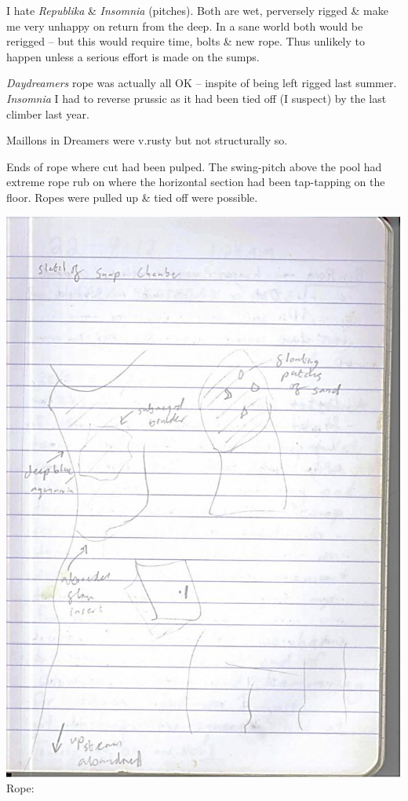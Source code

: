 I hate \emph{Republika} \& \emph{Insomnia} (pitches). Both are wet,
perversely rigged \& make me very unhappy on return from the deep. In a
sane world both would be rerigged -- but this would require time, bolts
\& new rope. Thus unlikely to happen unless a serious effort is made on
the sumps.

\emph{Daydreamers} rope was actually all OK -- inspite of being left
rigged last summer. \emph{Insomnia} I had to reverse prussic as it had
been tied off (I suspect) by the last climber last year.

Maillons in Dreamers were v.rusty but not structurally so.

Ends of rope where cut had been pulped. The swing-pitch above the pool
had extreme rope rub on where the horizontal section had been
tap-tapping on the floor. Ropes were pulled up \& tied off were
possible.

\includegraphics{UgLog1012/65.jpeg}Rope:

